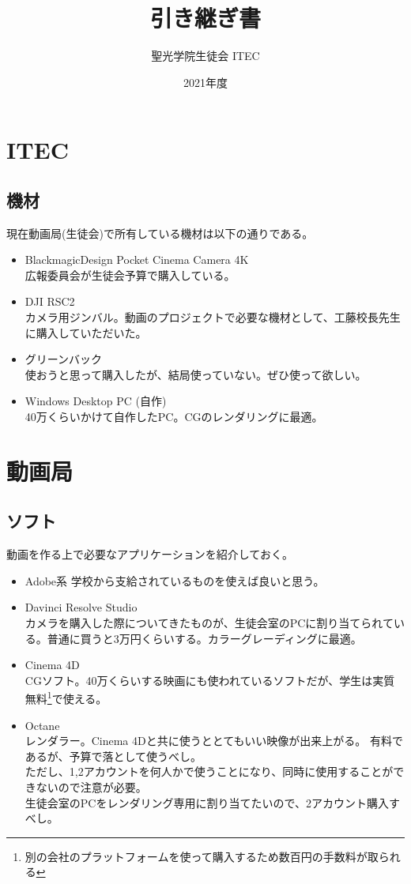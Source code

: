 \documentclass[dvipdfmx,ja4,11pt,tittlepage]{jsarticle}
\title{引き継ぎ書}
\author{聖光学院生徒会 ITEC}
\date{2021年度}
\begin{document}
\maketitle
\newpage
\section{ITEC}
 \subsection{機材}
 現在動画局(生徒会)で所有している機材は以下の通りである。
 \begin{itemize}
 \item BlackmagicDesign Pocket Cinema Camera 4K\\
 広報委員会が生徒会予算で購入している。
 \item DJI RSC2\\
 カメラ用ジンバル。動画のプロジェクトで必要な機材として、工藤校長先生に購入していただいた。
 \item グリーンバック\\
 使おうと思って購入したが、結局使っていない。ぜひ使って欲しい。
 \item Windows Desktop PC (自作)\\
 40万くらいかけて自作したPC。CGのレンダリングに最適。
 \end{itemize}
\section{動画局}
\subsection{ソフト}
 動画を作る上で必要なアプリケーションを紹介しておく。
 \begin{itemize}
 \item Adobe系
 学校から支給されているものを使えば良いと思う。
 \item Davinci Resolve Studio\\
 カメラを購入した際についてきたものが、生徒会室のPCに割り当てられている。普通に買うと3万円くらいする。カラーグレーディングに最適。
 \item Cinema 4D\\
 CGソフト。40万くらいする映画にも使われているソフトだが、学生は実質無料\footnote{別の会社のプラットフォームを使って購入するため数百円の手数料が取られる}で使える。
 \item Octane\\
 レンダラー。Cinema 4Dと共に使うととてもいい映像が出来上がる。
 有料であるが、予算で落として使うべし。\\ただし、1,2アカウントを何人かで使うことになり、同時に使用することができないので注意が必要。\\生徒会室のPCをレンダリング専用に割り当てたいので、2アカウント購入すべし。
 \end{itemize}
\end{document}
